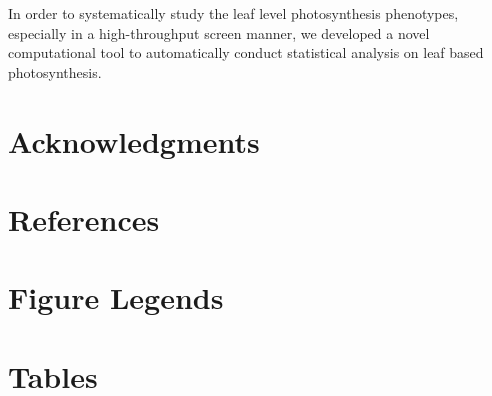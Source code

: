 {In order to systematically study the leaf level photosynthesis phenotypes, especially in a high-throughput screen manner, we developed a novel computational tool to automatically conduct statistical analysis on leaf based photosynthesis.



\section*{Acknowledgments}


\section*{References}

%
%
%

\section*{Figure Legends}
%


\section*{Tables}
%
%
%

}
